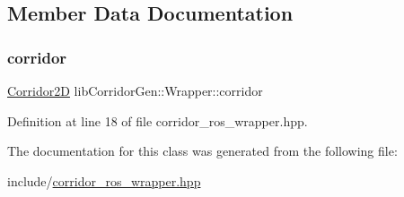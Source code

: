 \subsection{Member Data Documentation}
\mbox{\label{classlib_corridor_gen_1_1_wrapper_a5f842d988a9f607bde2493d1c9d09e91}} 
\subsubsection{\texorpdfstring{corridor}{corridor}}
{\footnotesize\ttfamily \hyperlink{struct_corridor2_d}{Corridor2D} lib\+Corridor\+Gen\+::\+Wrapper\+::corridor}



Definition at line 18 of file corridor\+\_\+ros\+\_\+wrapper.\+hpp.



The documentation for this class was generated from the following file\+:\begin{DoxyCompactItemize}
\item 
include/\hyperlink{corridor__ros__wrapper_8hpp}{corridor\+\_\+ros\+\_\+wrapper.\+hpp}\end{DoxyCompactItemize}
